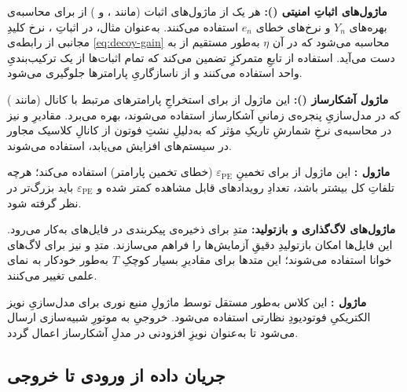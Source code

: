 \textbf{ماژول‌های اثباتِ امنیتی ():} هر یک از ماژول‌های اثبات (مانند ،  و ) از  برای محاسبه‌ی بهره‌های $Y_n$ و نرخ‌های خطای $e_n$ استفاده می‌کنند. به‌عنوان مثال، در اثباتِ ، نرخ کلیدِ مجانبی از رابطه‌ی \eqref{eq:decoy-gain} محاسبه می‌شود که در آن $\eta$ به‌طور مستقیم از  به دست می‌آید. استفاده از تابعِ متمرکزِ  تضمین می‌کند که تمام اثبات‌ها از یک ترکیب‌بندیِ واحد استفاده می‌کنند و از ناسازگاریِ پارامترها جلوگیری می‌شود.

\textbf{ماژول آشکارساز ():} این ماژول از  برای استخراجِ پارامترهای مرتبط با کانال (مانند ) که در مدل‌سازیِ پنجره‌ی زمانیِ آشکارساز استفاده می‌شوند، بهره می‌برد. مقادیرِ  و  نیز در محاسبه‌ی نرخِ شمارشِ تاریکِ مؤثر  که به‌دلیلِ نشتِ فوتون از کانالِ کلاسیک  مجاور در سیستم‌های  افزایش می‌یابد، استفاده می‌شوند.

\textbf{ماژول :} این ماژول از  برای تخمینِ $\varepsilon_{\text{PE}}$ (خطای تخمین پارامتر) استفاده می‌کند؛ هرچه تلفاتِ کل بیشتر باشد، تعدادِ رویدادهای قابل مشاهده کمتر شده و $\varepsilon_{\text{PE}}$ باید بزرگ‌تر در نظر گرفته شود.

\textbf{ماژول‌های لاگ‌گذاری و بازتولید:} متدِ  برای ذخیره‌ی پیکربندی در فایل‌های  به‌کار می‌رود. این فایل‌ها امکان بازتولیدِ دقیقِ آزمایش‌ها را فراهم می‌سازند. متدِ  و  نیز برای لاگ‌های خوانا استفاده می‌شوند؛ این متدها برای مقادیرِ بسیار کوچکِ $T$ به‌طور خودکار به نمای علمی تغییر می‌کنند.

\textbf{ماژول :} این کلاس به‌طور مستقل توسط ماژولِ منبع نوری  برای مدل‌سازیِ نویز الکتریکیِ فوتودیودِ نظارتی استفاده می‌شود. خروجیِ  به موتورِ شبیه‌سازی ارسال می‌شود تا به‌عنوان نویزِ افزودنی در مدلِ آشکارساز اعمال گردد.

\subsection{جریان داده از ورودی تا خروجی}

